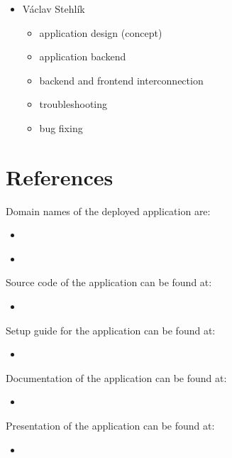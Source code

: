 \documentclass[11pt,a4paper]{article}
\begin{document}
\begin{itemize}
    \item Václav Stehlík
    \begin{itemize}
        \item application design (concept)
        \item application backend
        \item backend and frontend interconnection
        \item troubleshooting
        \item bug fixing
    \end{itemize}
\end{itemize}

\section{References}

Domain names of the deployed application are:
\begin{itemize}
    \item \href{https://pa181.eu-de.mybluemix.net/}{\color{urlcolor}{pa181.eu-de.mybluemix.net}}
    \item \href{https://pa181.eu-de.cf.appdomain.cloud/}{\color{urlcolor}{pa181.eu-de.cf.appdomain.cloud}}
\end{itemize}

Source code of the application can be found at:
\begin{itemize}
    \item \href{https://github.com/europ/MUNI-FI-PA181/tree/master/src}{\color{urlcolor}{github.com/europ/MUNI-FI-PA181/tree/master/src}}
\end{itemize}

Setup guide for the application can be found at:
\begin{itemize}
    \item \href{https://github.com/europ/MUNI-FI-PA181/wiki/Setup}{\color{urlcolor}{github.com/europ/MUNI-FI-PA181/wiki/Setup}}
\end{itemize}

Documentation of the application can be found at:
\begin{itemize}
    \item \href{https://github.com/europ/MUNI-FI-PA181/blob/master/doc/doc.pdf}{\color{urlcolor}{github.com/europ/MUNI-FI-PA181/blob/master/doc/doc.pdf}}
\end{itemize}

Presentation of the application can be found at:
\begin{itemize}
    \item \href{https://github.com/europ/MUNI-FI-PA181/blob/master/pres/pres.pdf}{\color{urlcolor}{github.com/europ/MUNI-FI-PA181/blob/master/pres/pres.pdf}}
\end{itemize}
\end{document}
